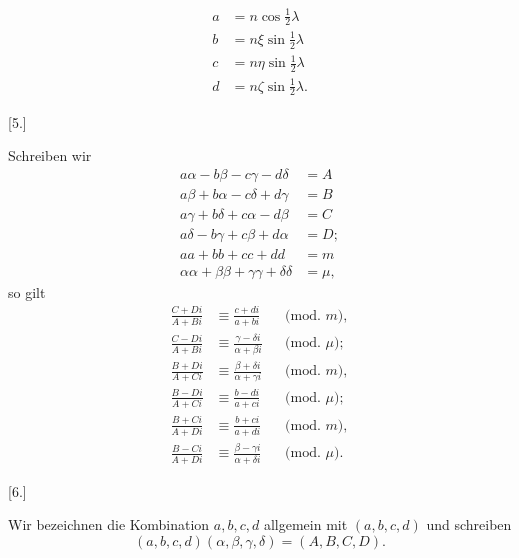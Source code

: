 \[
\begin{aligned}
a&=n\cos\tfrac12\lambda\\
b&=n\xi\sin\tfrac12\lambda\\
c&=n\eta\sin\tfrac12\lambda\\
d&=n\zeta\sin\tfrac12\lambda.
\end{aligned}
\]

\begin{center}[5.]\end{center}

Schreiben wir
\[
\begin{aligned}
a\alpha-b\beta-c\gamma-d\delta&=A\\
a\beta+b\alpha-c\delta+d\gamma&=B\\
a\gamma+b\delta+c\alpha-d\beta&=C\\
a\delta-b\gamma+c\beta+d\alpha&=D;\\
aa+bb+cc+dd&=m\\
\alpha\alpha+\beta\beta+\gamma\gamma+\delta\delta&=\mu,
\end{aligned}
\]
so gilt
\[
\begin{aligned}
\frac{C+Di}{A+Bi}&\equiv\frac{c+di}{a+bi}&&\text{(mod. }m\text{)},\\[3pt]
\frac{C-Di}{A+Bi}&\equiv\frac{\gamma-\delta i}{\alpha+\beta i}&&\text{(mod. }\mu\text{)};\\[12pt]
\frac{B+Di}{A+Ci}&\equiv\frac{\beta+\delta i}{\alpha+\gamma i}&&\text{(mod. }m\text{)},\\[3pt]
\frac{B-Di}{A+Ci}&\equiv\frac{b-di}{a+ci}&&\text{(mod. }\mu\text{)};\\[12pt]
\frac{B+Ci}{A+Di}&\equiv\frac{b+ci}{a+di}&&\text{(mod. }m\text{)},\\[3pt]
\frac{B-Ci}{A+Di}&\equiv\frac{\beta-\gamma i}{\alpha+\delta i}&&\text{(mod. }\mu\text{)}.
\end{aligned}
\]

\begin{center}[6.]\end{center}

Wir bezeichnen die Kombination $a,b,c,d$ allgemein mit $(a,b,c,d)$ und schreiben
\[
(a,b,c,d)(\alpha,\beta,\gamma,\delta)=(A,B,C,D).
\]
